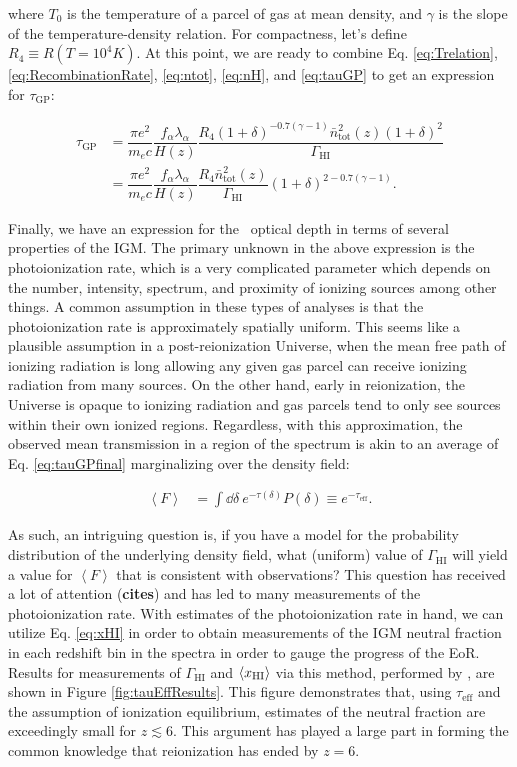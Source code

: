 where $T_0$ is the temperature of a parcel of gas at mean density, and $\gamma$ is the slope of the temperature-density relation. For compactness, let's define $R_{4} \equiv R(T=10^{4}K)$. At this point, we are ready to combine Eq. \ref{eq:Trelation}, \ref{eq:RecombinationRate}, \ref{eq:ntot}, \ref{eq:nH}, and \ref{eq:tauGP} to get an expression for $\tau_{\text{GP}}$:

\begin{align}
\tau_{\text{GP}} &= \dfrac{\pi e^2}{m_e c}\dfrac{f_{\alpha}\lambda_{\alpha}}{H(z)} \dfrac{R_{4}(1+\delta)^{-0.7(\gamma - 1)}\bar{n}_{\text{tot}}^{2}(z)(1+\delta)^2}{\Gamma_{\text{HI}}}\\
&= \dfrac{\pi e^2}{m_e c}\dfrac{f_{\alpha}\lambda_{\alpha}}{H(z)} \dfrac{R_4 \bar{n}_{\text{tot}}^{2}(z)}{\Gamma_{\text{HI}}} (1+\delta)^{2-0.7(\gamma-1)}. \label{eq:tauGPfinal}
\end{align}

Finally, we have an expression for the \lya\ optical depth in terms of several properties of the IGM. The primary unknown in the above expression is the photoionization rate, which is a very complicated parameter which depends on the number, intensity, spectrum, and proximity of ionizing sources among other things. A common assumption in these types of analyses is that the photoionization rate is approximately spatially uniform. This seems like a plausible assumption in a post-reionization Universe, when the mean free path of ionizing radiation is long allowing any given gas parcel can receive ionizing radiation from many sources. On the other hand, early in reionization, the Universe is opaque to ionizing radiation and gas parcels tend to only see sources within their own ionized regions. Regardless, with this approximation, the observed mean transmission in a region of the spectrum is akin to an average of Eq. \ref{eq:tauGPfinal} marginalizing over the density field:

\begin{align}
\left\langle F \right\rangle &= \int \dd \delta\ e^{-\tau(\delta)} P(\delta) \equiv e^{-\tau_{\text{eff}}}.
\end{align}


 As such, an intriguing question is, if you have a model for the probability distribution of the underlying density field, what (uniform) value of $\Gamma_{\text{HI}}$ will yield a value for $\left\langle F \right\rangle$ that is consistent with observations? This question has received a lot of attention ({\bf cites}) and has led to many measurements of the photoionization rate. With estimates of the photoionization rate in hand, we can utilize Eq. \ref{eq:xHI} in order to obtain measurements of the IGM neutral fraction in each redshift bin in the spectra in order to gauge the progress of the EoR. Results for measurements of $\Gamma_{\text{HI}}$ and $\langle x_{\text{HI}}\rangle$ via this method, performed by \cite{Fan2006a}, are shown in Figure \ref{fig:tauEffResults}. This figure demonstrates that, using $\tau_{\text{eff}}$ and the assumption of ionization equilibrium, estimates of the neutral fraction are exceedingly small for $z \lesssim 6$. This argument has played a large part in forming the common knowledge that reionization has ended by $z = 6$. 

